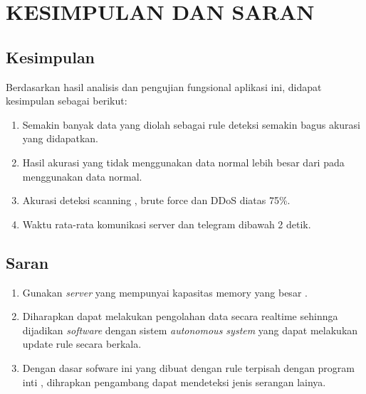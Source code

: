 
\chapter{KESIMPULAN DAN SARAN}

\section{Kesimpulan}
	Berdasarkan hasil analisis dan pengujian fungsional aplikasi ini, didapat kesimpulan sebagai berikut:

	\begin{enumerate}
		\item Semakin banyak data yang diolah sebagai rule deteksi semakin bagus akurasi
		yang didapatkan.
		
		\item Hasil akurasi yang tidak menggunakan data normal lebih besar dari pada menggunakan data normal.
		
		\item Akurasi deteksi scanning , brute force dan DDoS diatas 75\%.
		
		\item  Waktu rata-rata komunikasi server dan telegram dibawah 2 detik.
		
	
		
	\end{enumerate}


\section{Saran}
	\begin{enumerate}
		\item Gunakan \emph{server} yang mempunyai kapasitas memory yang besar . 
		
		\item Diharapkan dapat melakukan pengolahan data secara realtime sehinnga dijadikan \emph{software} dengan sistem \emph{autonomous system} yang dapat melakukan update rule secara berkala. 
		
		\item Dengan dasar sofware ini yang dibuat dengan rule terpisah dengan program inti , dihrapkan pengambang dapat mendeteksi jenis serangan lainya.
 
	\end{enumerate}

	
\begin{comment}

\end{comment}
